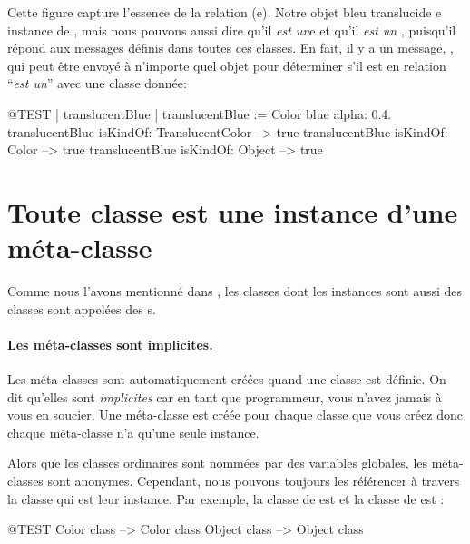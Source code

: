 \documentclass[a4paper,10pt,twoside]{book}
\begin{document}
Cette figure capture l'essence de la relation (e).
Notre objet bleu translucide e instance de
, mais nous pouvons aussi dire qu'il
\emph{est un}{}e   et qu'il \emph{est un} , puisqu'il répond aux messages définis dans toutes ces classes.
En fait, il y a un message, , qui peut être envoyé à n'importe quel objet pour déterminer s'il est en relation ``\emph{est un}'' avec une classe donnée:

\begin{code}{@TEST | translucentBlue |}
translucentBlue := Color blue alpha: 0.4.
translucentBlue isKindOf: TranslucentColor --> true
translucentBlue isKindOf: Color                    --> true
translucentBlue isKindOf: Object                  --> true
\end{code}

\section{Toute classe est une instance d'une méta-classe}


Comme nous l'avons mentionné dans , les classes dont les instances sont aussi des classes sont appelées des s.

\paragraph{Les méta-classes sont implicites.}
Les méta-classes sont automatiquement créées quand une classe est définie.
On dit qu'elles sont \emph{implicites} car en tant que programmeur, vous n'avez jamais à vous en soucier.
Une méta-classe  est créée pour chaque classe que vous créez donc chaque méta-classe n'a qu'une seule instance.

Alors que les classes ordinaires sont nommées par des variables globales, les méta-classes sont anonymes.
Cependant, nous pouvons toujours les référencer à travers la classe qui est leur instance.
Par exemple, la classe de  est  et la classe de  est :
\begin{code}{@TEST}
Color class   --> Color class
Object class --> Object class
\end{code}
\end{document}

